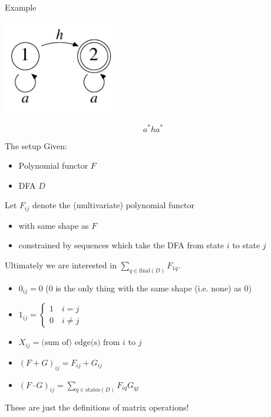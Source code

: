 \documentclass[xcolor=svgnames,12pt]{beamer}
\newenvironment{xframe}[1][]
  {\begin{frame}[fragile,environment=xframe,#1]}
  {\end{frame}}
\begin{document}
\begin{xframe}{Example}
  \begin{center}
    \includegraphics[width=2in]{deriv-DFA}

    \[ a^*ha^* \]
  \end{center}
\end{xframe}

\begin{xframe}{The setup}
  Given:
  \begin{itemize}
  \item Polynomial functor $F$
  \item DFA $D$
  \end{itemize} \medskip

  Let $F_{ij}$ denote the (multivariate) polynomial functor
  \begin{itemize}
    \item with same shape as $F$
    \item constrained by sequences which take the DFA from state $i$
      to state $j$
  \end{itemize} \medskip

  Ultimately we are interested in $\sum_{q \in \mathrm{final}(D)} F_{1q}$.
\end{xframe}


\begin{xframe}
  \begin{itemize}
  \item<+-> $0_{ij} = 0$ ($0$ is the only thing with the same shape
    (i.e. none) as $0$)
  \item<+-> $ 1_{ij} = \begin{cases} 1 \quad i = j \\ 0 \quad i \neq
      j \end{cases}$ 
  \item<+-> $X_{ij} = \text{(sum of) edge(s) from $i$ to $j$}$
  \item<+-> $(F + G)_{ij} = F_{ij} + G_{ij}$
  \item<+-> $(F \cdot G)_{ij} = \sum_{q \in \mathrm{states}(D)} F_{iq} G_{qj}$
  \end{itemize} \bigskip

   These are just the definitions of matrix operations!
\end{xframe}
\end{document}

